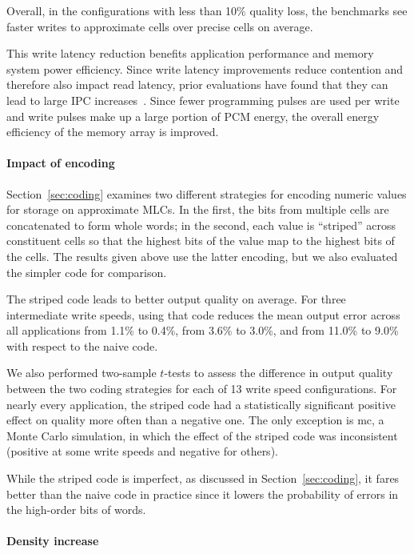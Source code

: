 \documentclass[prodmode,acmtocs]{acmsmall}
\begin{document}
\vskip 12pt
\noindent
Overall, in the configurations with less than 10\% quality loss, the benchmarks
see  faster writes to approximate cells over precise cells on
average.

This write latency reduction benefits application performance and memory
system power efficiency. Since write latency improvements reduce contention
and therefore also impact read latency, prior evaluations have found that they
can lead to large IPC increases~\cite{improvingwrites,powertokens}. Since fewer
programming pulses are used per write and write pulses make up a large portion
of PCM energy, the overall energy efficiency of the memory array is improved.

\paragraph{Impact of encoding}

Section~\ref{sec:coding} examines two different strategies for encoding
numeric values for storage on approximate MLCs. In the first, the bits from
multiple cells are concatenated to form whole words; in the second, each value
is ``striped'' across constituent cells so that the highest bits of the value
map to the highest bits of the cells. The results given above use
the latter encoding, but we also evaluated the simpler code for comparison.

The striped code leads to better output quality on average.
For three intermediate write speeds, using that code reduces the mean
output error across all applications from 1.1\% to 0.4\%, from 3.6\% to 3.0\%,
and from 11.0\% to 9.0\% with respect to the naive code.

We also
performed two-sample $t$-tests to assess the difference in output quality
between the two coding strategies for each of 13 write speed
configurations. For nearly every application, the striped code had a
statistically significant positive effect on quality more often than a
negative one. The only exception is \textsf{mc}, a Monte Carlo simulation, in
which the effect of the striped code was inconsistent (positive at some write
speeds and negative for others). 

While the striped code is imperfect, as
discussed in Section~\ref{sec:coding}, it fares better than the naive code in
practice since it lowers the probability of errors in the high-order bits of
words.


\paragraph{Density increase}
\end{document}
